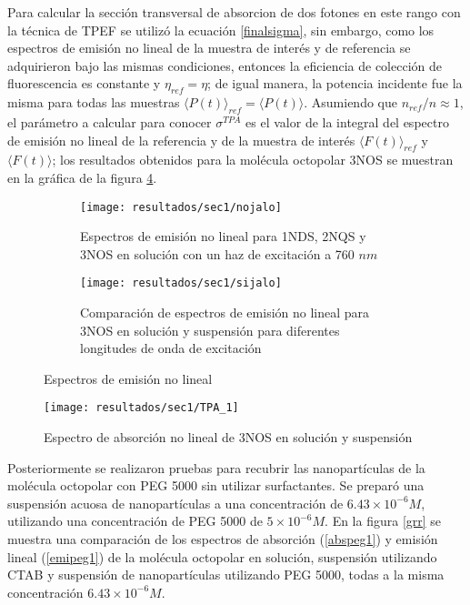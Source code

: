 Para calcular la secci\'on transversal de absorcion de dos fotones en este rango con la t\'ecnica de TPEF se utiliz\'o la ecuaci\'on \ref{finalsigma}, sin embargo, como los espectros de emisi\'on no lineal de la muestra de inter\'es y de referencia se adquirieron bajo las mismas condiciones, entonces la eficiencia de colecci\'on de fluorescencia es constante y $\eta_{ref}=\eta$; de igual manera, la potencia incidente fue la misma para todas las muestras $\langle P(t)\rangle_{ref}=\langle P(t)\rangle$. Asumiendo que $n_{ref}/n\approx 1$, el par\'ametro a calcular para conocer $\sigma^{TPA}$ es el valor de la integral del espectro de emisi\'on no lineal de la referencia y de la muestra de inter\'es $\langle F(t)\rangle_{ref}$ y $\langle F(t)\rangle$; los resultados obtenidos para la mol\'ecula octopolar 3NOS se muestran en la gr\'afica de la figura \ref{tpaprimeros}.

\begin{figure}
\centering
\begin{subfigure}{\textwidth}
\centering
\texttt{[image: resultados/sec1/nojalo]}
\caption{Espectros de emisi\'on no lineal para 1NDS, 2NQS y 3NOS en soluci\'on con un haz de excitaci\'on a 760 $nm$ }\label{nel}
\end{subfigure}
\begin{subfigure}{\textwidth}
\centering
\texttt{[image: resultados/sec1/sijalo]}
\caption{Comparaci\'on de espectros de emisi\'on no lineal para 3NOS en soluci\'on y suspensi\'on para diferentes longitudes de onda de excitaci\'on }\label{sip}
\end{subfigure}
\caption{Espectros de emisi\'on no lineal}
\label{ghghh}
\end{figure}

\begin{figure}[h]
\centering
\texttt{[image: resultados/sec1/TPA\_1]}
\caption{Espectro de absorci\'on no lineal de 3NOS en soluci\'on y suspensi\'on}\label{tpaprimeros}
\end{figure}

Posteriormente se realizaron pruebas para recubrir las nanopart\'iculas de la mol\'ecula octopolar con PEG 5000 sin utilizar surfactantes. Se prepar\'o una suspensi\'on acuosa de nanopart\'iculas a una concentraci\'on de $6.43 \times 10^{-6}M$, utilizando una concentraci\'on de PEG 5000 de $5\times 10^{-6} M$. En la figura \ref{grr} se muestra una comparaci\'on de los espectros de absorci\'on (\ref{abspeg1}) y emisi\'on lineal (\ref{emipeg1}) de la mol\'ecula octopolar en soluci\'on, suspensi\'on utilizando CTAB y suspensi\'on de nanopart\'iculas utilizando PEG 5000, todas a la misma concentraci\'on $6.43 \times 10^{-6}M$. 

